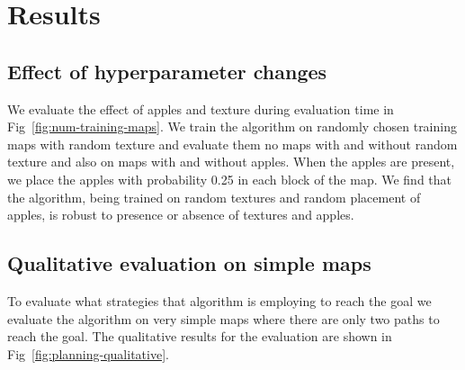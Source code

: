 %
%

\section{Results}

\subsection{Effect of hyperparameter changes}
We evaluate the effect of apples and texture during evaluation time in Fig~\ref{fig:num-training-maps}.
We train the algorithm on randomly chosen training maps with random texture and evaluate them no maps with and without random texture and also on maps with and without apples. When the apples are present, we place the apples with probability 0.25 in each block of the map.
We find that the algorithm, being trained on random textures and random placement of apples, is robust to presence or absence of textures and apples.


\subsection{Qualitative evaluation on simple maps}
To evaluate what strategies that algorithm is employing to reach the
goal we evaluate the algorithm on very simple maps where there are only two
paths to reach the goal. The qualitative results for the evaluation are shown
in Fig~\ref{fig:planning-qualitative}.


